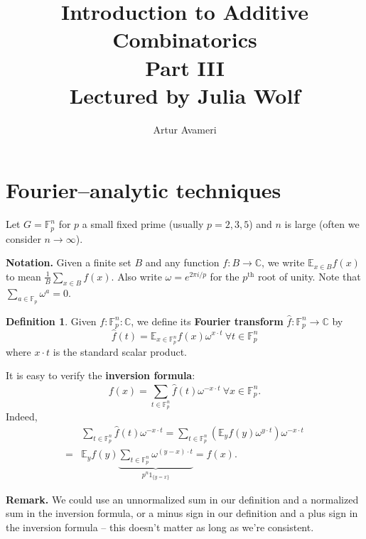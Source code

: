 \documentclass{article}
\title{Introduction to Additive Combinatorics \\ Part III
    \\ \large
    Lectured by Julia Wolf
}
\author{Artur Avameri}
\date{}
\theoremstyle{definition}
\newtheorem{defn}[theorem]{Definition}
\begin{document}
\maketitle
\tableofcontents
\newpage
 
\section{Fourier--analytic techniques}



Let $G = \mathbb{F}_{p}^n$ for $p$ a small fixed prime (usually $p = 2,3,5$) and $n$ is large (often we consider $n \to \infty$).
\vspace{1mm}
 
\textbf{Notation.} Given a finite set $B$ and any function $f : B \to \mathbb{C}$, we write $\mathbb{E}_{x \in B}f(x)$ to mean $\frac{1}{B}\sum_{x \in B} f(x)$. Also write $\omega = e^{2\pi i /p}$ for the $p^{\text{th}}$ root of unity. Note that $\sum_{a \in \mathbb{F}_p}^{} \omega^a = 0$.

\begin{defn}
    Given $f : \mathbb{F}_{p}^n : \mathbb{C}$, we define its \textbf{Fourier transform} $\hat{f} : \mathbb{F}_{p}^n \to \mathbb{C}$ by \[
    \hat{f}(t) = \mathbb{E}_{x \in \mathbb{F}_{p}^n} f(x)\omega^{x \cdot t} ~\forall  t \in \mathbb{F}_{p}^n
    \] 
    where $x \cdot t$ is the standard scalar product.
\end{defn}
It is easy to verify the \textbf{inversion formula}:
\[
f(x) = \sum_{t \in \mathbb{F}_{p}^n}^{} \hat{f}(t) \omega^{-x \cdot t} ~\forall  x \in \mathbb{F}_{p}^n.
\]
Indeed, 
\begin{align*}
    &\sum_{t \in \mathbb{F}_{p}^n}^{} \hat{f}(t) \omega^{-x \cdot t} = \sum_{t \in \mathbb{F}_{p}^n}^{} \left(\mathbb{E}_y f(y) \omega^{y \cdot t} \right)\omega^{-x \cdot t}\\
    =& \mathbb{E}_y f(y) \underbrace{\sum_{t \in \mathbb{F}_{p}^n}^{} \omega^{(y-x)\cdot t}}_{p^n 1_{\{y=x\}}} = f(x).
\end{align*}

\textbf{Remark.} We could use an unnormalized sum in our definition and a normalized sum in the inversion formula, or a minus sign in our definition and a plus sign in the inversion formula -- this doesn't matter as long as we're consistent.

\vspace{1mm}
 
\end{document}
